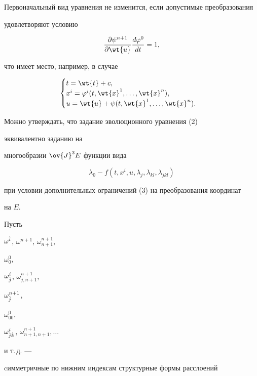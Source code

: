 Первоначальный вид уравнения не изменится, если допустимые преобразования


удовлетворяют условию


$$


\frac{\partial\psi^{n+1}}{\partial\wt{u}}


\frac{d\varphi^0}{dt}=1,


$$


что имеет место, например, в случае


\begin{equation}


\begin{cases}


t=\wt{t}+c, \\


x^i=\varphi^i(t,\wt{x}^1,\dotsc,\wt{x}^n), \\


u=\wt{u}+\psi(t,\wt{x}^1,\dotsc,\wt{x}^n).


\end{cases}


\end{equation}





Можно утверждать, что задание эволюционного уравнения (2) 


эквивалентно заданию на


многообразии $\ov{J}^3E$ функции вида


$$


\lambda_0-f(t,{x}^i,u,\lambda_j,\lambda_{kl},\lambda_{jkl})


$$


при условии дополнительных ограничений (3) на преобразования координат


на $E$.





Пусть


${\omega }^{\Hat i}$, ${\omega }^{n+1}$, ${\omega }^{n+1}_{n+1}$,


${\omega }^0_0$,


${\omega }^i_{\Hat j}$, ${\omega }^{n+1}_{j,{n+1}}$,


${\omega }^{n+1}_{\Hat j}$,


${\omega }^0_{00}$,


${\omega }^i_{{\Hat j}{\Hat k}}$, ${\omega }^{n+1}_{{n+1},{n+1}}, \dotsc$


и т.\,д. ---


cимметричные по нижним индексам структурные формы расслоений


